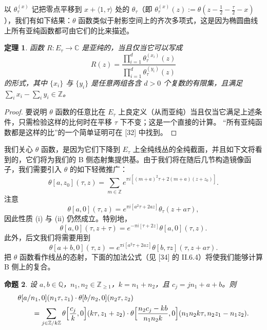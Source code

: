 \documentclass[11pt,a4paper]{article}
\theoremstyle{plain}
\newtheorem{theorem}{定理}[section]
\newtheorem{proposition}[theorem]{命题}
\theoremstyle{definition}
\begin{document}
以 $\theta_\tau^{(x)}$ 记把零点平移到 $x+\langle 1,\tau\rangle$ 处的 $\theta_\tau$（即 $\theta_\tau^{(x)}(z):=\theta(z-\frac{1}{2}-\frac{\tau}{2}-x)$），我们有如下结果：$\theta$ 函数类似于射影空间上的齐次多项式，这是因为椭圆曲线上所有亚纯函数都可由它们的比来描述。

\begin{theorem}
函数 $R\colon E_\tau\to\mathbb{C}$ 是亚纯的，当且仅当它可以写成
\[
R(z)=\frac{\prod_{i=1}^{d}\theta_\tau^{(x_i)}(z)}{\prod_{i=1}^{d}\theta_\tau^{(y_i)}(z)}
\]
的形式，其中 $\{x_i\}$ 与 $\{y_i\}$ 是任意两组各含 $d>0$ 个复数的有限集，且满足 $\sum_i x_i-\sum_i y_i\in\mathbb{Z}$。
\end{theorem}
\begin{proof}
要说明 $\theta$ 函数的任意比在 $E_\tau$ 上良定义（从而亚纯）当且仅当它满足上述条件，只需检验这样的比何时在平移 $\tau$ 下不变；这是一个直接的计算。
“所有亚纯函数都是这样的比”的一个简单证明可在 [32] 中找到。
\end{proof}

我们关心 $\theta$ 函数，是因为它们下降到 $E_\tau$ 上全纯线丛的全纯截面，并且如下文将看到的，它们将为我们的 B 侧态射集提供基。由于我们将在随后几节构造镜像函子，我们需要引入 $\theta$ 的如下轻微推广：
\[
\theta[a,z_0](\tau,z)=\sum_{m\in\mathbb{Z}}e^{\pi i[(m+a)^2\tau+2(m+a)(z+z_0)]}.
\]
注意
\[
\theta[a,0](\tau,z)=e^{\pi i[a^2\tau+2az]}\theta_\tau(z+a\tau),
\]
因此性质 (i) 与 (ii) 仍然成立。特别地，
\[
\theta[a,0](\tau,z+\tau)=e^{-\pi i[\tau+2z]}\theta[a,0](\tau,z).
\]
此外，后文我们将需要用到
\[
\theta[a+b,0](\tau,z)=e^{\pi i[a^2\tau+2az]}\theta[b,\tau z](\tau,z+a\tau).
\]
把 $\theta$ 函数看作线丛的态射，下面的加法公式（见 [34] 的 II.6.4）将使我们能够计算 B 侧上的复合。

\begin{proposition}
设 $a,b\in\mathbb{Q}$，$n_1,n_2\in\mathbb{Z}_{\ge 1}$，$k=n_1+n_2$，且 $c_j=jn_1+a+b$。则
\[
\begin{aligned}
&\theta[a/n_1,0](n_1\tau,z_1)\cdot\theta[b/n_2,0](n_2\tau,z_2)\\
&\qquad=\sum_{j\in\mathbb{Z}/k\mathbb{Z}}\theta\Bigl[\frac{c_j}{k},0\Bigr](k\tau,z_1+z_2)\cdot\theta\Bigl[\frac{n_2c_j-kb}{n_1n_2k},0\Bigr](n_1n_2k\tau,n_2z_1-n_1z_2).
\end{aligned}
\]
\end{proposition}
\end{document}
